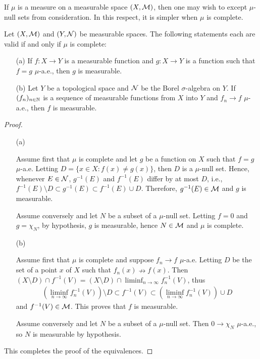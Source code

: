 If $\mu$ is a measure on a measurable space $(X, {\mathcal{M}})$, then one may wish to except $\mu$-null sets from consideration.
In this respect, it is simpler when $\mu$ is complete.
\begin{prop}
    Let $(X, {\mathcal{M}})$ and $(Y, {\mathcal{N}})$ be measurable spaces.
    The following statements each are valid if and only if $\mu$ is complete:
    \begin{enumerate}
        \item[(a)]
        {
            If $f: X\rightarrow Y$ is a measurable function and $g: X\rightarrow Y$ is a function such that $f=g$ $\mu$-a.e., then $g$ is measurable.
        }
        \item[(b)]
        {
            Let $Y$ be a topological space and ${\mathcal{N}}$ be the Borel $\sigma$-algebra on $Y$.
            If $(f_n)_{n\in{\mathbb{N}}}$ is a sequence of measurable functions from $X$ into $Y$ and $f_n\rightarrow f$ $\mu$-a.e., then $f$ is measurable.
        }
    \end{enumerate}
\end{prop}
\begin{proof}
    \begin{enumerate}
        \item[(a)]
        {
            Assume first that $\mu$ is complete and let $g$ be a function on $X$ such that $f=g$ $\mu$-a.e.
            Letting $D=\{x\in X: f(x)\neq g(x)\}$, then $D$ is a $\mu$-null set.
            Hence, whenever $E\in{\mathcal{N}}$, $g^{-1}(E)$ and $f^{-1}(E)$ differ by at most $D$, i.e., $f^{-1}(E)\setminus D\subset g^{-1}(E)\subset f^{-1}(E)\cup D$.
            Therefore, $g^{-1}(E)\in{\mathcal{M}}$ and $g$ is measurable.

            Assume conversely and let $N$ be a subset of a $\mu$-null set.
            Letting $f=0$ and $g=\chi_N$, by hypothesis, $g$ is measurable, hence $N\in{\mathcal{M}}$ and $\mu$ is complete.
        }
        \item[(b)]
        {
            Assume first that $\mu$ is complete and suppose $f_n\rightarrow f$ $\mu$-a.e.
            Letting $D$ be the set of a point $x$ of $X$ such that $f_n(x)\nrightarrow f(x)$.
            Then $(X\setminus D)\cap f^{-1}(V)=(X\setminus D)\cap\liminf_{n\rightarrow\infty} f_n^{-1}(V)$, thus
            \begin{align*}
                (\liminf_{n\rightarrow\infty} f_n^{-1}(V))\setminus D\subset f^{-1}(V)\subset(\liminf_{n\rightarrow\infty} f_n^{-1}(V))\cup D
            \end{align*}
            and $f^{-1}(V)\in{\mathcal{M}}$.
            This proves that $f$ is measurable.

            Assume conversely and let $N$ be a subset of a $\mu$-null set.
            Then $0\rightarrow\chi_N$ $\mu$-a.e., so $N$ is measurable by hypothesis.
        }
    \end{enumerate}
    This completes the proof of the equivalences.
\end{proof}

